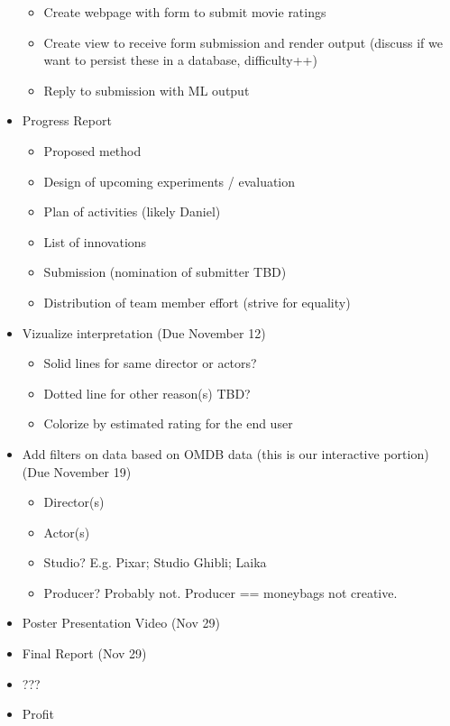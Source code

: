 \documentclass[sigchi, 12pt, nonacm=true, timestamp=true, screen=true]{acmart}
\begin{document}
\begin{itemize}
    \begin{itemize}
      \item Create webpage with form to submit movie ratings
      \item Create view to receive form submission and render output (discuss if we want to persist these in a database, difficulty++)
      \item Reply to submission with ML output
    \end {itemize}
  \item Progress Report
    \begin{itemize}
      \item Proposed method
      \item Design of upcoming experiments / evaluation
      \item Plan of activities (likely Daniel)
      \item List of innovations
      \item Submission (nomination of submitter TBD)
      \item Distribution of team member effort (strive for equality)
    \end{itemize}
  \item Vizualize interpretation (Due November 12)
    \begin{itemize}
      \item Solid lines for same director or actors?
      \item Dotted line for other reason(s) TBD?
      \item Colorize by estimated rating for the end user
    \end{itemize}
  \item Add filters on data based on OMDB data (this is our interactive portion) (Due November 19)
    \begin{itemize}
      \item Director(s)
      \item Actor(s)
      \item Studio? E.g. Pixar; Studio Ghibli; Laika
      \item Producer? Probably not. Producer == moneybags not creative.
    \end{itemize}
  \item Poster Presentation Video (Nov 29)
  \item Final Report (Nov 29)
  \item ???
  \item Profit
\end{itemize}






\end{document}
